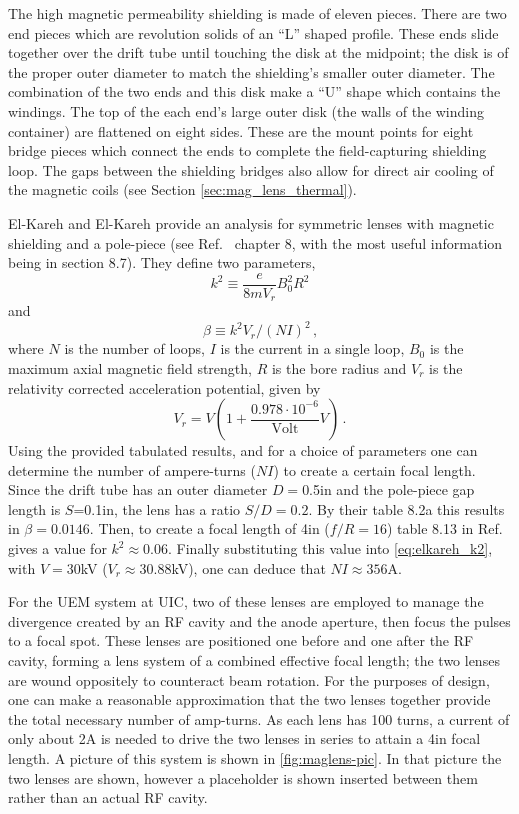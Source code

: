The high magnetic permeability shielding is made of eleven pieces.
There are two end pieces which are revolution solids of an ``L'' shaped profile.
These ends slide together over the drift tube until touching the disk at the midpoint; the disk is of the proper outer diameter to match the shielding's smaller outer diameter.
The combination of the two ends and this disk make a ``U'' shape which contains the windings.
The top of the each end's large outer disk (the walls of the winding container) are flattened on eight sides.
These are the mount points for eight bridge pieces which connect the ends to complete the field-capturing shielding loop.
The gaps between the shielding bridges also allow for direct air cooling of the magnetic coils (see Section \ref{sec:mag_lens_thermal}).

El-Kareh and El-Kareh provide an analysis for symmetric lenses with magnetic shielding and a pole-piece (see Ref.~\cite{el-kareh_electron_1970} chapter 8, with the most useful information being in section 8.7).
They define two parameters,
\begin{equation}
  k^2 \equiv \frac{e}{8 m V_r} B_0^2 R^2
\end{equation}
and
\begin{equation} \label{eq:elkareh_k2}
  \beta \equiv k^2 V_r / (NI)^2 \,\text{,}
\end{equation}
where $N$ is the number of loops, $I$ is the current in a single loop, $B_0$ is the maximum axial magnetic field strength, $R$ is the bore radius and $V_r$ is the relativity corrected acceleration potential, given by
\begin{equation}
  V_r = V ( 1 + \frac{0.978 \cdot 10^{-6}}{\text{Volt}} V ) \,\text{.}
\end{equation}
Using the provided tabulated results, and for a choice of parameters one can determine the number of ampere-turns ($NI$) to create a certain focal length.
Since the drift tube has an outer diameter $D=$0.5in and the pole-piece gap length is $S$=0.1in, the lens has a ratio $S/D=0.2$.
By their table 8.2a this results in $\beta=0.0146$.
Then, to create a focal length of 4in ($f/R=16$) table 8.13 in Ref.~\cite{el-kareh_electron_1970} gives a value for $k^2 \approx 0.06$.
Finally substituting this value into \ref{eq:elkareh_k2}, with $V=30$kV ($V_r\approx30.88$kV), one can deduce that $NI\approx356$A.

For the UEM system at UIC, two of these lenses are employed to manage the divergence created by an RF cavity and the anode aperture, then focus the pulses to a focal spot. 
These lenses are positioned one before and one after the RF cavity, forming a lens system of a combined effective focal length; the two lenses are wound oppositely to counteract beam rotation.
For the purposes of design, one can make a reasonable approximation that the two lenses together provide the total necessary number of amp-turns.
As each lens has 100 turns, a current of only about 2A is needed to drive the two lenses in series to attain a 4in focal length.
A picture of this system is shown in \ref{fig:maglens-pic}.
In that picture the two lenses are shown, however a placeholder is shown inserted between them rather than an actual RF cavity.

